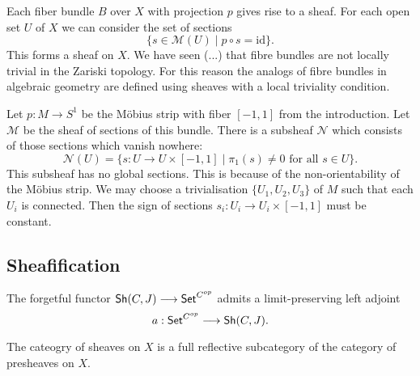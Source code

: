 \begin{construction}
	Each fiber bundle $B$ over $X$ with projection $p$ gives rise to a sheaf. For each open set $U$ of $X$ we can consider the set of sections 
	\[
		\{s \in \mathcal{M}(U) \mid p \circ s = \text{id}\}.
	\]
	This forms a sheaf on $X$. We have seen (...) that fibre bundles are not locally trivial in the Zariski topology. For this reason the analogs of fibre bundles in algebraic geometry are defined using sheaves with a local triviality condition.
\end{construction}
\begin{example}
	Let $p : M \to S^1$ be the M\"obius strip with fiber $[-1,1]$ from the introduction. Let $\mathcal{M}$ be the sheaf of sections of this bundle. There is a subsheaf $\mathcal{N}$ which consists of those sections which vanish nowhere:
	\[
		\mathcal{N}(U) = \{s : U \to U \times [-1,1] \mid \pi_1(s) \neq 0 \text{ for all } s \in U\}.
	\]
	This subsheaf has no global sections. This is because of the non-orientability of the M\"obius strip. We may choose a trivialisation $\{U_1, U_2, U_3\}$ of $M$ such that each $U_i$ is connected. Then the sign of sections $s_i: U_i \to U_i \times [-1,1]$ must be constant. 
\end{example}


\subsection{Sheafification}

\begin{theorem}
	The forgetful functor $\mathsf{Sh}(C,J) \longrightarrow \mathsf{Set}^{C^{op}}$ admits a limit-preserving left adjoint
	\[a : \mathsf{Set}^{C^{op}} \longrightarrow \mathsf{Sh}(C,J).\]
\end{theorem}
\begin{corollary}
	The cateogry of sheaves on $X$ is a full reflective subcategory of the category of presheaves on $X$.
\end{corollary}

